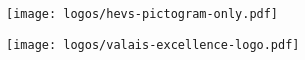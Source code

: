 \begin{titlepage}
{  \vfill
  \begin{minipage}{0.5\textwidth}
    \begin{flushleft}
      \texttt{[image: logos/hevs-pictogram-only.pdf]}
    \end{flushleft}
  \end{minipage}%
  \begin{minipage}{0.5\textwidth}
    \begin{flushright}
      \texttt{[image: logos/valais-excellence-logo.pdf]}
    \end{flushright}
  \end{minipage}

\vspace{5pt}

}
\restoregeometry
\end{titlepage}



